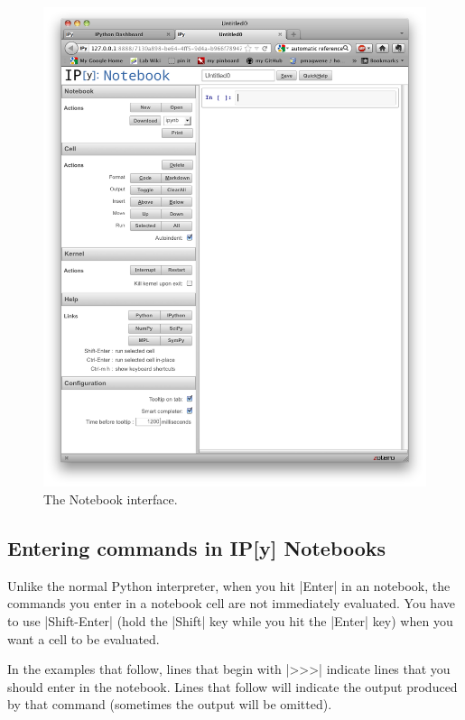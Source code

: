 \begin{figure}[!ht]
    \centering
    \includegraphics[height=0.5\textheight]{./figures/hands-on8/ipy-interface.png}
    \caption{The \ipy Notebook interface.}\label{fig:ipynotebook}
\end{figure}

\subsection{Entering commands in IP[y] Notebooks}

Unlike the normal Python interpreter, when you hit |Enter| in an \ipy notebook, the commands you enter in a notebook cell are not immediately evaluated. You have to use |Shift-Enter| (hold the |Shift| key while you hit the |Enter| key) when you want a cell to be evaluated.

In the examples that follow, lines that begin with |>>>| indicate lines that you should enter in the \ipy notebook. Lines that follow will indicate the output produced by that command (sometimes the output will be omitted).

